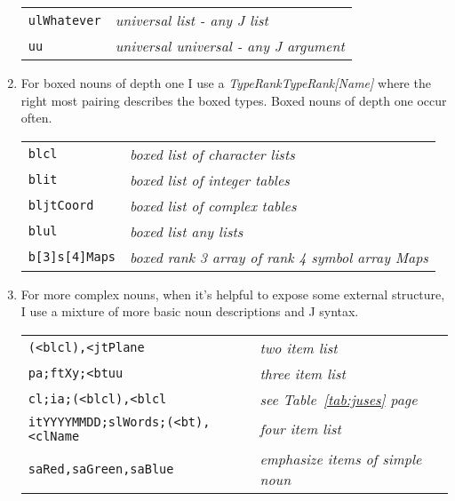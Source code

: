 \begin{enumerate}
\begin{center}
\begin{tabular}{ll}
   \texttt{ulWhatever} & \textcolor{CodeComment}{\ttfamily\textsl{universal list - any J list}} \\ 
   \texttt{uu} & \textcolor{CodeComment}{\ttfamily\textsl{universal universal - any J argument}} \\ 
\end{tabular}
\end{center}
 \item For boxed nouns of depth one I use a \textsl{TypeRankTypeRank[Name]} where the right most      pairing describes the boxed types.  Boxed nouns of depth one occur often.
 \begin{center}
 \footnotesize
\begin{tabular}{ll}
   \texttt{blcl} & \textcolor{CodeComment}{\ttfamily\textsl{boxed list of character lists}} \\ 
   \texttt{blit} & \textcolor{CodeComment}{\ttfamily\textsl{boxed list of integer tables}}  \\
   \texttt{bljtCoord} & \textcolor{CodeComment}{\ttfamily\textsl{boxed list of complex tables}} \\   
   \texttt{blul} & \textcolor{CodeComment}{\ttfamily\textsl{boxed list any lists}} \\ 
   \texttt{b[3]s[4]Maps} & \textcolor{CodeComment}{\ttfamily\textsl{boxed rank 3 array of rank 4 symbol array Maps }} \\ 
\end{tabular}
\end{center} 
 \item For more complex nouns, when it's helpful to expose some external structure, I use
 a mixture of more basic noun descriptions and J syntax. 
  \begin{center}
 \footnotesize
\begin{tabular}{ll}
   \texttt{(<blcl),<jtPlane} & \textcolor{CodeComment}{\ttfamily\textsl{two item list}} \\ 
   \texttt{pa;ftXy;<btuu} & \textcolor{CodeComment}{\ttfamily\textsl{three item list}}  \\
   \texttt{cl;ia;(<blcl),<blcl} & 
     \textcolor{CodeComment}{\ttfamily\textsl{see Table~\ref{tab:juses} page~\pageref{tab:juses}}} \\
   \texttt{itYYYYMMDD;slWords;(<bt),<clName} &
     \textcolor{CodeComment}{\ttfamily\textsl{four item list}} \\
   \texttt{saRed,saGreen,saBlue} & 
     \textcolor{CodeComment}{\ttfamily\textsl{emphasize items of simple noun}} \\

\end{tabular}
\end{center}
\end{enumerate}
